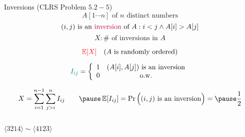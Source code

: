 
\begin{frame}{}
  \begin{exampleblock}{Inversions (CLRS Problem $5.2-5$)}
    \[
      A[1 \cdots n] \text{ of } n \text{ distinct numbers}
    \]
    \[
      (i,j) \text{ is an \textcolor{purple}{inversion} of } A : i < j \land A[i] > A[j]
    \]
    \[
      X: \# \text{ of inversions in } A
    \]

    \pause
    \[
      \textcolor{red}{\operatorname*{\mathbb{E}}[X]} \quad (A \text{ is randomly ordered})
    \]
  \end{exampleblock}

  \pause
  \[
    \textcolor{teal}{I_{ij}} = \left\{\begin{array}{lc}
      1 & (A[i], A[j]) \text{ is an inversion} \\
      0 & \text{o.w.}
    \end{array}\right.
  \]

  \[
    X = \sum_{i=1}^{n-1} \sum_{j>i}^{n} I_{ij} \qquad \pause \E[I_{ij}] = \Pr\Big((i,j) \text{ is an inversion}\Big) = \pause \frac{1}{2}
  \]
\end{frame}

\begin{frame}{}
  \begin{columns}
      \pause
      \pause
      \[
	\langle 3214 \rangle \sim \langle 4123 \rangle
      \]
  \end{columns}
\end{frame}
